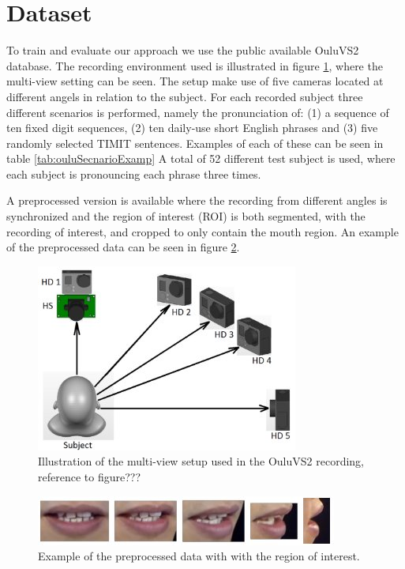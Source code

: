 \section{Dataset}
\label{sec:dataset}
To train and evaluate our approach we use the public available OuluVS2 database.
The recording environment used is illustrated in figure \ref{fig:ouluMultiView}, where the multi-view setting can be seen.
The setup make use of five cameras located at different angels in relation to the subject.
For each recorded subject three different scenarios is performed, namely the pronunciation of: 
(1) a sequence of ten fixed digit sequences,
(2) ten daily-use short English phrases and
(3) five randomly selected TIMIT sentences.
Examples of each of these can be seen in table \ref{tab:ouluSecnarioExamp}
A total of 52 different test subject is used, where each subject is pronouncing each phrase three times.

A preprocessed version is available where the recording from different angles is synchronized and the region of interest (ROI) is both segmented, with the recording of interest, and cropped to only contain the mouth region.
An example of the preprocessed data can be seen in figure \ref{fig:ouluPreprocessed}.

\begin{figure}[h]
    \centering
    \includegraphics[width=0.6\columnwidth]{fig/ouluMultiView.jpg}
    \caption{Illustration of the multi-view setup used in the OuluVS2 recording, reference to figure???}
    \label{fig:ouluMultiView}
\end{figure}
\begin{figure}[h]
    \centering
    \includegraphics[width=\columnwidth]{fig/ouluPreprocessed.jpg}
    \caption{Example of the preprocessed data with with the region of interest.}
    \label{fig:ouluPreprocessed}
\end{figure}

